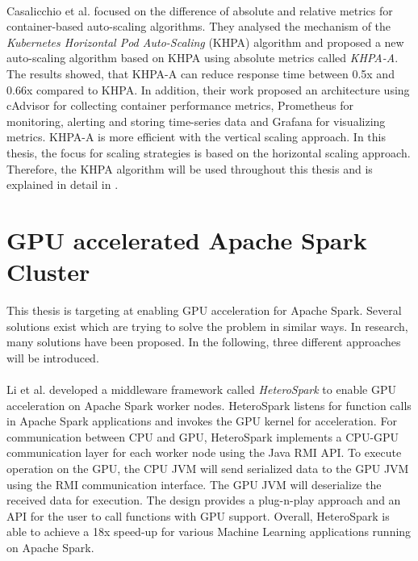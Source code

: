 \paragraph{}Casalicchio et al. \cite{Casalicchio2017AutoScaleCont} focused on the difference of absolute and relative metrics for container-based auto-scaling algorithms. They analysed the mechanism of the \textit{Kubernetes Horizontal Pod Auto-Scaling} (KHPA) algorithm and proposed a new auto-scaling algorithm based on KHPA using absolute metrics called \textit{KHPA-A}. The results showed, that KHPA-A can reduce response time between 0.5x and 0.66x compared to KHPA. In addition, their work proposed an architecture using cAdvisor for collecting container performance metrics, Prometheus for monitoring, alerting and storing time-series data and Grafana for visualizing metrics.
KHPA-A is more efficient with the vertical scaling approach. In this thesis, the focus for scaling strategies is based on the horizontal scaling approach. Therefore, the KHPA algorithm will be used throughout this thesis and is explained in detail in .


\section{GPU accelerated Apache Spark Cluster}
This thesis is targeting at enabling GPU acceleration for Apache Spark.
Several solutions exist which are trying to solve the problem in similar ways.
In research, many solutions have been proposed.
In the following, three different approaches will be introduced.


\paragraph{}
Li et al. \cite{Li2015HeteroSpark} developed a middleware framework called \textit{HeteroSpark} to enable GPU acceleration on Apache Spark worker nodes. HeteroSpark listens for function calls in Apache Spark applications and invokes the GPU kernel for acceleration. For communication between CPU and GPU, HeteroSpark implements a CPU-GPU communication layer for each worker node using the Java RMI API. To execute operation on the GPU, the CPU JVM will send serialized data to the GPU JVM using the RMI communication interface. The GPU JVM will deserialize the received data for execution.
The design provides a plug-n-play approach and an API for the user to call functions with GPU support.
Overall, HeteroSpark is able to achieve a 18x speed-up for various Machine Learning applications running on Apache Spark.


